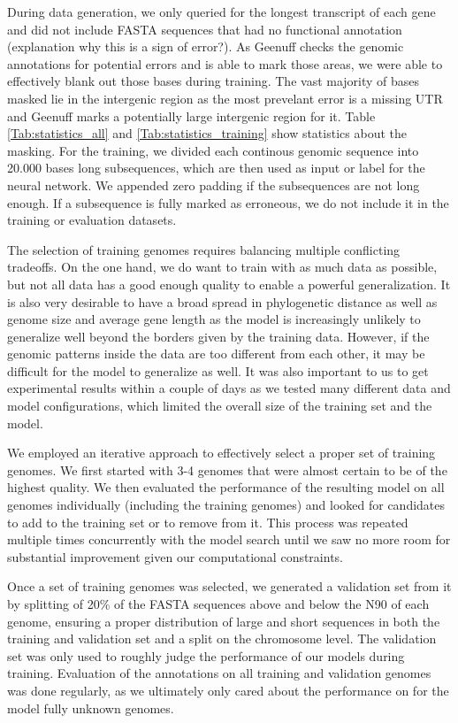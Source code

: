 \documentclass{bioinfo}
\begin{document}
\begin{methods}
During data generation, we only queried for the longest transcript of each gene and did not include FASTA sequences that had no functional annotation (explanation why this is a sign of error?). As Geenuff checks the genomic annotations for potential errors and is able to mark those areas, we were able to effectively blank out those bases during training. The vast majority of bases masked lie in the intergenic region as the most prevelant error is a missing UTR and Geenuff marks a potentially large intergenic region for it. Table \ref{Tab:statistics_all} and \ref{Tab:statistics_training} show statistics about the masking. For the training, we divided each continous genomic sequence into 20.000 bases long subsequences, which are then used as input or label for the neural network. We appended zero padding if the subsequences are not long enough. If a subsequence is fully marked as erroneous, we do not include it in the training or evaluation datasets.

The selection of training genomes requires balancing multiple conflicting tradeoffs. On the one hand, we do want to train with as much data as possible, but not all data has a good enough quality to enable a powerful generalization. It is also very desirable to have a broad spread in phylogenetic distance as well as genome size and average gene length as the model is increasingly unlikely to generalize well beyond the borders given by the training data. However, if the genomic patterns inside the data are too different from each other, it may be difficult for the model to generalize as well. It was also important to us to get experimental results within a couple of days as we tested many different data and model configurations, which limited the overall size of the training set and the model. 
	
We employed an iterative approach to effectively select a proper set of training genomes. We first started with 3-4 genomes that were almost certain to be of the highest quality. We then evaluated the performance of the resulting model on all genomes individually (including the training genomes) and looked for candidates to add to the training set or to remove from it. This process was repeated multiple times concurrently with the model search until we saw no more room for substantial improvement given our computational constraints.

Once a set of training genomes was selected, we generated a validation set from it by splitting of 20\% of the FASTA sequences above and below the N90 of each genome, ensuring a proper distribution of large and short sequences in both the training and validation set and a split on the chromosome level. The validation set was only used to roughly judge the performance of our models during training. Evaluation of the annotations on all training and validation genomes was done regularly, as we ultimately only cared about the performance on for the model fully unknown genomes. 


\end{methods}
\end{document}
